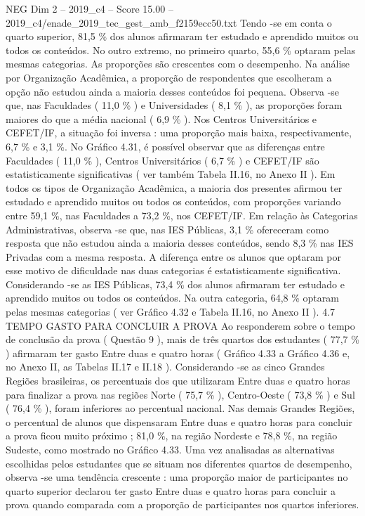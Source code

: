 \begin{textsample}{NEG Dim 2 – 2019\_c4 – Score 15.00 – 2019\_c4/enade\_2019\_tec\_gest\_amb\_f2159ecc50.txt}
Tendo -se em conta o quarto superior, 81,5 \% dos alunos afirmaram ter estudado e aprendido muitos ou todos os conteúdos.
No outro extremo, no primeiro quarto, 55,6 \% optaram pelas mesmas categorias.
As proporções são crescentes com o desempenho.
Na análise por Organização Acadêmica, a proporção de respondentes que escolheram a opção não estudou ainda a maioria desses conteúdos foi pequena.
Observa -se que, nas Faculdades ( 11,0 \% ) e Universidades ( 8,1 \% ), as proporções foram maiores do que a média nacional ( 6,9 \% ).
Nos Centros Universitários e CEFET/IF, a situação foi inversa : uma proporção mais baixa, respectivamente, 6,7 \% e 3,1 \%.
No Gráfico 4.31, é possível observar que as diferenças entre Faculdades ( 11,0 \% ), Centros Universitários ( 6,7 \% ) e CEFET/IF são estatisticamente significativas ( ver também Tabela II.16, no Anexo II ).
Em todos os tipos de Organização Acadêmica, a maioria dos presentes afirmou ter estudado e aprendido muitos ou todos os conteúdos, com proporções variando entre 59,1 \%, nas Faculdades a 73,2 \%, nos CEFET/IF.
Em relação às Categorias Administrativas, observa -se que, nas IES Públicas, 3,1 \% ofereceram como resposta que não estudou ainda a maioria desses conteúdos, sendo 8,3 \% nas IES Privadas com a mesma resposta.
A diferença entre os alunos que optaram por esse motivo de dificuldade nas duas categorias é estatisticamente significativa.
Considerando -se as IES Públicas, 73,4 \% dos alunos afirmaram ter estudado e aprendido muitos ou todos os conteúdos.
Na outra categoria, 64,8 \% optaram pelas mesmas categorias ( ver Gráfico 4.32 e Tabela II.16, no Anexo II ). 4.7 TEMPO GASTO PARA CONCLUIR A PROVA Ao responderem sobre o tempo de conclusão da prova ( Questão 9 ), mais de três quartos dos estudantes ( 77,7 \% ) afirmaram ter gasto Entre duas e quatro horas ( Gráfico 4.33 a Gráfico 4.36 e, no Anexo II, as Tabelas II.17 e II.18 ).
Considerando -se as cinco Grandes Regiões brasileiras, os percentuais dos que utilizaram Entre duas e quatro horas para finalizar a prova nas regiões Norte ( 75,7 \% ), Centro-Oeste ( 73,8 \% ) e Sul ( 76,4 \% ), foram inferiores ao percentual nacional.
Nas demais Grandes Regiões, o percentual de alunos que dispensaram Entre duas e quatro horas para concluir a prova ficou muito próximo ; 81,0 \%, na região Nordeste e 78,8 \%, na região Sudeste, como mostrado no Gráfico 4.33.
Uma vez analisadas as alternativas escolhidas pelos estudantes que se situam nos diferentes quartos de desempenho, observa -se uma tendência crescente : uma proporção maior de participantes no quarto superior declarou ter gasto Entre duas e quatro horas para concluir a prova quando comparada com a proporção de participantes nos quartos inferiores.

\end{textsample}
